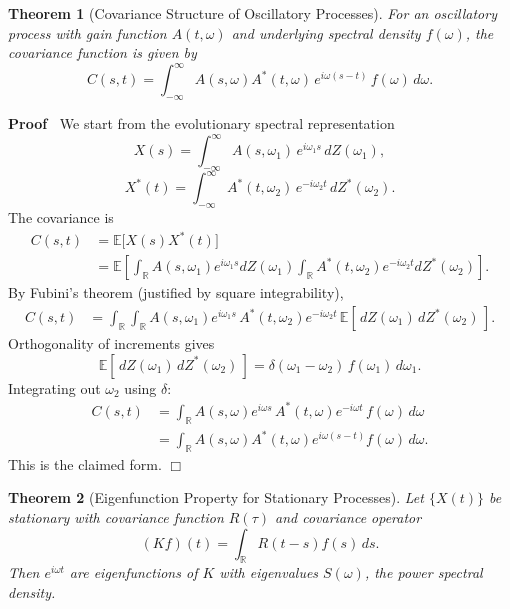 \documentclass{article}
\newenvironment{proof}{\noindent\textbf{Proof\ }}{\hspace*{\fill}$\Box$\medskip}
\newtheorem{theorem}{Theorem}
\begin{document}
\begin{theorem}
  [Covariance Structure of Oscillatory Processes]
  For an oscillatory process with gain function $A (t, \omega)$ and underlying spectral density $f
  (\omega)$, the covariance function is given by
  \begin{equation}
    C (s, t) = \int_{- \infty}^{\infty} A (s, \omega) A^{\ast} (t, \omega) \, e^{i\omega(s-t)} \, f
    (\omega) \, d \omega.
  \end{equation}
\end{theorem}

\begin{proof}
We start from the evolutionary spectral representation
\[
X(s) = \int_{-\infty}^\infty A(s,\omega_1)\, e^{i\omega_1 s} \, dZ(\omega_1),
\]
\[
X^*(t) = \int_{-\infty}^\infty A^*(t,\omega_2)\, e^{-i\omega_2 t} \, dZ^*(\omega_2).
\]
The covariance is
\begin{align*}
C(s,t) &= \mathbb{E}\big[ X(s) X^*(t) \big] \\
&= \mathbb{E}\left[ \int_{\mathbb{R}} A(s,\omega_1)e^{i\omega_1 s}dZ(\omega_1)
        \int_{\mathbb{R}} A^*(t,\omega_2) e^{-i\omega_2 t}dZ^*(\omega_2) \right].
\end{align*}
By Fubini's theorem (justified by square integrability),
\begin{align*}
C(s,t) &= \int_{\mathbb{R}} \int_{\mathbb{R}} 
     A(s,\omega_1) e^{i\omega_1 s} \, A^*(t,\omega_2) e^{-i\omega_2 t} \,
     \mathbb{E}[\,dZ(\omega_1)\,dZ^*(\omega_2)\,] .
\end{align*}
Orthogonality of increments gives
\[
\mathbb{E}[\,dZ(\omega_1)\, dZ^*(\omega_2)\,] =
       \delta(\omega_1 - \omega_2) \, f(\omega_1)\, d\omega_1 .
\]
Integrating out $\omega_2$ using $\delta$:
\begin{align*}
C(s,t) &= \int_{\mathbb{R}} A(s,\omega) e^{i\omega s} \, A^*(t,\omega) e^{-i\omega t} \,
    f(\omega) \, d\omega \\
&= \int_{\mathbb{R}} A(s,\omega) A^*(t,\omega) e^{i\omega(s-t)} f(\omega)\, d\omega.
\end{align*}
This is the claimed form.
\end{proof}

\begin{theorem}
  [Eigenfunction Property for Stationary Processes]
  Let $\{X (t)\}$ be stationary with covariance function $R (\tau)$
  and covariance operator
  \[
  (Kf) (t) = \int_{\mathbb{R}} R (t - s) f(s)\, ds.
  \]
  Then $e^{i \omega t}$ are eigenfunctions of $K$
  with eigenvalues $S (\omega)$, the power spectral density.
\end{theorem}
\end{document}
